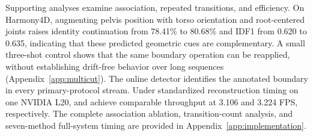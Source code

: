 

Supporting analyses examine association, repeated transitions, and
efficiency. On Harmony4D, augmenting pelvis position with torso orientation
and root-centered joints raises identity continuation from 78.41\% to 80.68\%
and IDF1 from 0.620 to 0.635, indicating that these predicted geometric cues
are complementary. A small three-shot control shows that the same boundary
operation can be reapplied, without establishing drift-free behavior over
long sequences (Appendix~\ref{app:multicut}). The online detector identifies
the annotated boundary in every primary-protocol stream. Under standardized
reconstruction timing on one NVIDIA L20, \method{} and \humanthree{} achieve
comparable throughput at 3.106 and 3.224 FPS, respectively. The complete
association ablation, transition-count analysis, and seven-method full-system
timing are provided in Appendix~\ref{app:implementation}.
